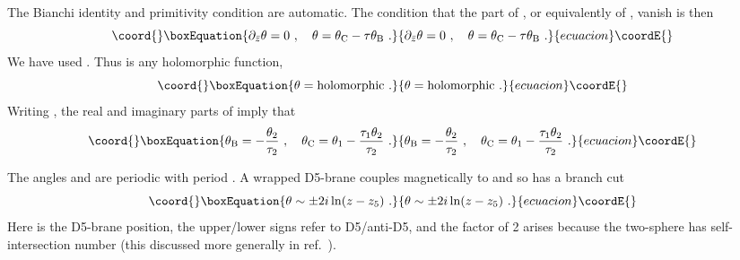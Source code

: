 \documentclass[a4paper,12pt]{article}
\renewcommand{\=}[1]{\bar{#1}}
\begin{document}
The Bianchi identity and primitivity condition are automatic.  The condition
that the \coordHE{} part of \coordHE{}, or equivalently of \coordHE{}, vanish is
then
\begin{equation}\coord{}\boxEquation{
\partial_{\bar z} \theta = 0\ ,\quad \theta =  \theta_{\rm C} - \tau \theta_{\rm
B}\ .
}{
\partial_{\bar z} \theta = 0\ ,\quad \theta =  \theta_{\rm C} - \tau \theta_{\rm
B}\ .
}{ecuacion}\coordE{}\end{equation}
We have used \coordHE{}.  Thus \myHighlight{$\theta$}\coordHE{} is any holomorphic
function,
\begin{equation}\coord{}\boxEquation{
\theta = \mbox{holomorphic}\ .\label{holoth}
}{
\theta = \mbox{holomorphic}\ .}{ecuacion}\coordE{}\end{equation}
Writing \coordHE{}, the real and
imaginary parts of \coordHE{} imply that
\begin{equation}\coord{}\boxEquation{
\theta_{\rm B} = -\frac{\theta_2}{\tau_2}\ , \quad
\theta_{\rm C} = \theta_1 - \frac{\tau_1 \theta_2}{\tau_2} \ .
}{
\theta_{\rm B} = -\frac{\theta_2}{\tau_2}\ , \quad
\theta_{\rm C} = \theta_1 - \frac{\tau_1 \theta_2}{\tau_2} \ .
}{ecuacion}\coordE{}\end{equation}

The angles \coordHE{} and \coordHE{} are periodic with period
\myHighlight{$2\pi$}\coordHE{}.  A wrapped D5-brane couples magnetically to \coordHE{}
and so \myHighlight{$\theta$}\coordHE{} has a branch cut
\begin{equation}\coord{}\boxEquation{
\theta \sim \pm 2 i \ln(z - z_{5})\ .
}{
\theta \sim \pm 2 i \ln(z - z_{5})\ .
}{ecuacion}\coordE{}\end{equation}
Here \coordHE{} is the D5-brane position, the upper/lower signs refer
to D5/anti-D5, and the factor of 2 arises because the two-sphere has
self-intersection number \coordHE{} (this discussed more generally in
ref.~\cite{GK-KN}).
\end{document}
